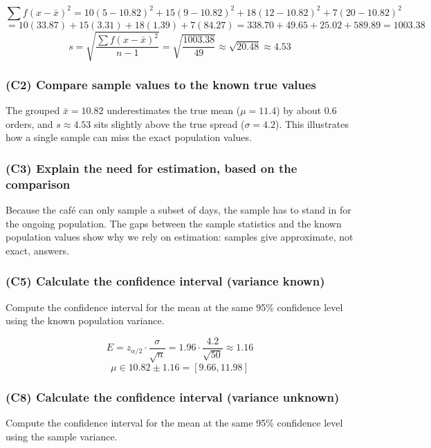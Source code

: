 \[
\sum f(x - \bar{x})^2 = 10(5 - 10.82)^2 + 15(9 - 10.82)^2 + 18(12 - 10.82)^2 + 7(20 - 10.82)^2
\]
\[
= 10(33.87) + 15(3.31) + 18(1.39) + 7(84.27) = 338.70 + 49.65 + 25.02 + 589.89 = 1003.38
\]
\[
 s = \sqrt{\frac{\sum f(x - \bar{x})^2}{n - 1}} = \sqrt{\frac{1003.38}{49}} \approx \sqrt{20.48} \approx 4.53
\]

\subsubsection{(C2) Compare sample values to the known true values}\label{subsubsec:interval-example1-2-c2}

The grouped \(\bar{x} = 10.82\) underestimates the true mean (\(\mu = 11.4\)) by about 0.6 orders, and \(s \approx 4.53\) sits slightly above the true spread (\(\sigma = 4.2\)). This illustrates how a single sample can miss the exact population values.

\subsubsection{(C3) Explain the need for estimation, based on the comparison}\label{subsubsec:interval-example1-2-c3}

Because the café can only sample a subset of days, the sample has to stand in for the ongoing population. The gaps between the sample statistics and the known population values show why we rely on estimation: samples give approximate, not exact, answers.

\subsubsection{(C5) Calculate the confidence interval (variance known)}\label{subsubsec:interval-example1-2-c5}

Compute the confidence interval for the mean at the same 95\% confidence level using the known population variance.

\[
E = z_{\alpha/2} \cdot \frac{\sigma}{\sqrt{n}} = 1.96 \cdot \frac{4.2}{\sqrt{50}} \approx 1.16
\]
\[
\mu \in 10.82 \pm 1.16 = [9.66, 11.98]
\]

\subsubsection{(C8) Calculate the confidence interval (variance unknown)}\label{subsubsec:interval-example1-2-c8}

Compute the confidence interval for the mean at the same 95\% confidence level using the sample variance.

